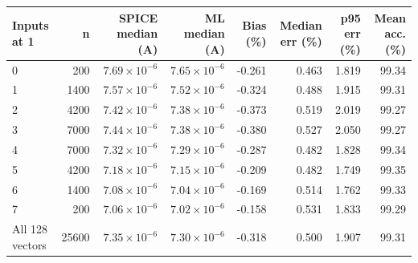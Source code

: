\begin{tabular}{lrrrrrrr}
\hline
Inputs at 1 & n & SPICE median (A) & ML median (A) & Bias (\%) & Median err (\%) & p95 err (\%) & Mean acc. (\%) \\
\hline
0 & 200 & $7.69\times10^{-6}$ & $7.65\times10^{-6}$ & -0.261 & 0.463 & 1.819 & 99.34 \\
1 & 1400 & $7.57\times10^{-6}$ & $7.52\times10^{-6}$ & -0.324 & 0.488 & 1.915 & 99.31 \\
2 & 4200 & $7.42\times10^{-6}$ & $7.38\times10^{-6}$ & -0.373 & 0.519 & 2.019 & 99.27 \\
3 & 7000 & $7.44\times10^{-6}$ & $7.38\times10^{-6}$ & -0.380 & 0.527 & 2.050 & 99.27 \\
4 & 7000 & $7.32\times10^{-6}$ & $7.29\times10^{-6}$ & -0.287 & 0.482 & 1.828 & 99.34 \\
5 & 4200 & $7.18\times10^{-6}$ & $7.15\times10^{-6}$ & -0.209 & 0.482 & 1.749 & 99.35 \\
6 & 1400 & $7.08\times10^{-6}$ & $7.04\times10^{-6}$ & -0.169 & 0.514 & 1.762 & 99.33 \\
7 & 200 & $7.06\times10^{-6}$ & $7.02\times10^{-6}$ & -0.158 & 0.531 & 1.833 & 99.29 \\
All 128 vectors & 25600 & $7.35\times10^{-6}$ & $7.30\times10^{-6}$ & -0.318 & 0.500 & 1.907 & 99.31 \\
\hline
\end{tabular}
